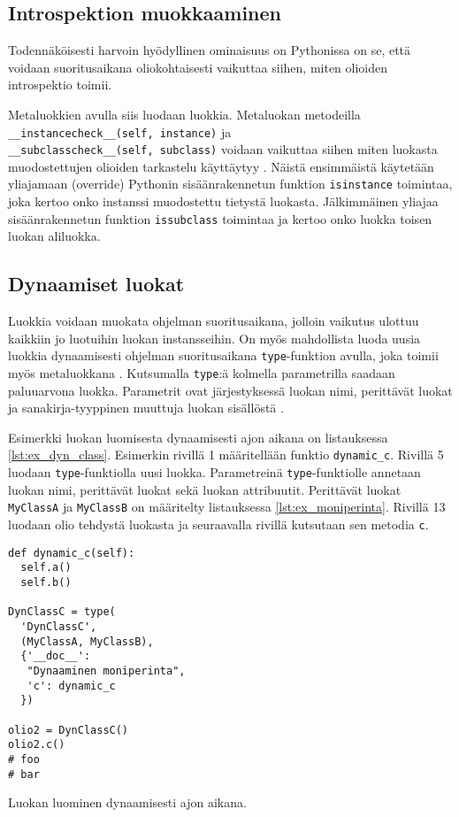 \documentclass[finnish]{tktltiki2}
\theoremstyle{definition}
\theoremstyle{remark}
\begin{document}
\subsection{Introspektion muokkaaminen}

Todennäköisesti harvoin hyödyllinen ominaisuus on Pythonissa on se, että voidaan suoritusaikana oliokohtaisesti vaikuttaa siihen, miten olioiden introspektio toimii.

Metaluokkien avulla siis luodaan luokkia. Metaluokan metodeilla \\\verb|__instancecheck__(self, instance)| ja \\\lstinline|__subclasscheck__(self, subclass)| voidaan vaikuttaa siihen miten luokasta muodostettujen olioiden tarkastelu käyttäytyy \cite{magic-methods, Python-docs}. Näistä ensimmäistä käytetään yliajamaan (override) Pythonin sisäänrakennetun funktion \verb|isinstance| toimintaa, joka kertoo onko instanssi muodostettu tietystä luokasta. Jälkimmäinen yliajaa sisäänrakennetun funktion \verb|issubclass| toimintaa ja kertoo onko luokka toisen luokan aliluokka. 

\subsection{Dynaamiset luokat}

Luokkia voidaan muokata ohjelman suoritusaikana, jolloin vaikutus ulottuu kaikkiin jo luotuihin luokan instansseihin. On myös mahdollista luoda uusia luokkia dynaamisesti ohjelman suoritusaikana \verb|type|-funktion avulla, joka toimii myös metaluokkana \cite{MetaprogP3}. Kutsumalla \verb|type|:ä kolmella parametrilla saadaan paluuarvona luokka. Parametrit ovat järjestyksessä luokan nimi, perittävät luokat ja sanakirja-tyyppinen muuttuja luokan sisällöstä \cite{MetaprogP3}. 

Esimerkki luokan luomisesta dynaamisesti ajon aikana on listauksessa \ref{lst:ex_dyn_class}. Esimerkin rivillä 1 määritellään funktio \verb|dynamic_c|. Rivillä 5 luodaan \verb|type|-funktiolla uusi luokka. Parametreinä \verb|type|-funktiolle annetaan luokan nimi, perittävät luokat sekä luokan attribuutit. Perittävät luokat \verb|MyClassA| ja \verb|MyClassB| on määritelty listauksessa \ref{lst:ex_moniperinta}. Rivillä 13 luodaan olio tehdystä luokasta ja seuraavalla rivillä kutsutaan sen metodia \verb|c|.

\begin{listing}[htb]
\begin{verbatim}
def dynamic_c(self):
  self.a()
  self.b()

DynClassC = type(
  'DynClassC',
  (MyClassA, MyClassB),
  {'__doc__':
   "Dynaaminen moniperinta",
   'c': dynamic_c
  })

olio2 = DynClassC()
olio2.c()
# foo
# bar
\end{verbatim}
    \caption{Luokan luominen dynaamisesti ajon aikana.}
    \label{lst:ex_dyn_class}
\end{listing}
\end{document}
